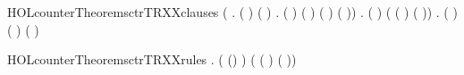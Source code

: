 \begin{SaveVerbatim}{HOLcounterTheoremsctrTRXXclauses}
\HOLTokenTurnstile{} (\HOLSymConst{\HOLTokenForall{}}      .
        (   ) (   ) \HOLSymConst{\HOLTokenEquiv{}}
      \HOLSymConst{\HOLTokenExists{}}  .
        ( \HOLSymConst{=} \HOLSymConst{::}) \HOLSymConst{\HOLTokenConj{}} ( \HOLSymConst{=} ) \HOLSymConst{\HOLTokenConj{}} ( \HOLSymConst{=}   ) \HOLSymConst{\HOLTokenConj{}}
        ( \HOLSymConst{=}   \HOLSymConst{::})) \HOLSymConst{\HOLTokenConj{}}
   \HOLSymConst{\HOLTokenForall{}}     .
       (   )
       (  (  ) (  \HOLSymConst{::})) \HOLSymConst{\HOLTokenEquiv{}}
     \HOLSymConst{\HOLTokenExists{}}. ( \HOLSymConst{=} \HOLSymConst{::}) \HOLSymConst{\HOLTokenConj{}} ( \HOLSymConst{=} ) \HOLSymConst{\HOLTokenConj{}} ( \HOLSymConst{=} )
\end{SaveVerbatim}
\newcommand{\HOLcounterTheoremsctrTRXXclauses}{\UseVerbatim{HOLcounterTheoremsctrTRXXclauses}}
\begin{SaveVerbatim}{HOLcounterTheoremsctrTRXXrules}
\HOLTokenTurnstile{} \HOLSymConst{\HOLTokenForall{}}   .
       ( (\HOLSymConst{::})  )
       (  (  ) (  \HOLSymConst{::}))
\end{SaveVerbatim}

